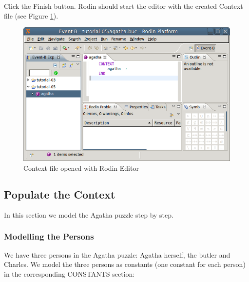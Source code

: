 Click the \textsf{Finish} button. Rodin should start the editor with the created Context file (see Figure \ref{fig_tut_05_context_file}). 

\begin{figure}[h!t]
\begin{center}
	\includegraphics{img/tutorial/tut_05_agatha2_neweditor.png}
	\caption{Context file opened with Rodin Editor}
	\label{fig_tut_05_context_file}
\end{center}
\end{figure}


\subsection{Populate the Context}
\label{tut_populate_context}

In this section we model the Agatha puzzle step by step.

\subsubsection{Modelling the Persons}
\label{tut_modelling_persons}

We have three persons in the Agatha puzzle: Agatha herself, the butler and Charles. We model the three persons as constants (one constant for each person) in the corresponding \textsf{CONSTANTS} section:


